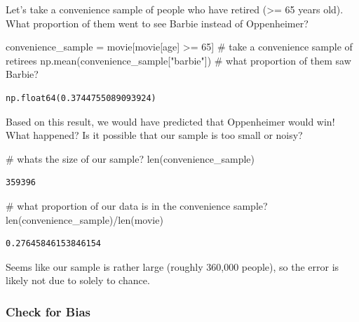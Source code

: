 \documentclass[
  letterpaper,
  DIV=11,
  numbers=noendperiod]{scrreprt}
\newenvironment{Shaded}{\begin{snugshade}}{\end{snugshade}}
\newcommand{\BuiltInTok}[1]{\textcolor[rgb]{0.00,0.23,0.31}{#1}}
\newcommand{\CommentTok}[1]{\textcolor[rgb]{0.37,0.37,0.37}{#1}}
\newcommand{\DecValTok}[1]{\textcolor[rgb]{0.68,0.00,0.00}{#1}}
\newcommand{\NormalTok}[1]{\textcolor[rgb]{0.00,0.23,0.31}{#1}}
\newcommand{\OperatorTok}[1]{\textcolor[rgb]{0.37,0.37,0.37}{#1}}
\newcommand{\StringTok}[1]{\textcolor[rgb]{0.13,0.47,0.30}{#1}}
\begin{document}
Let's take a convenience sample of people who have retired
(\textgreater= 65 years old). What proportion of them went to see Barbie
instead of Oppenheimer?

\begin{Shaded}
\begin{Highlighting}[]
\NormalTok{convenience\_sample }\OperatorTok{=}\NormalTok{ movie[movie[}\StringTok{\textquotesingle{}age\textquotesingle{}}\NormalTok{] }\OperatorTok{\textgreater{}=} \DecValTok{65}\NormalTok{] }\CommentTok{\# take a convenience sample of retirees}
\NormalTok{np.mean(convenience\_sample[}\StringTok{"barbie"}\NormalTok{]) }\CommentTok{\# what proportion of them saw Barbie? }
\end{Highlighting}
\end{Shaded}

\begin{verbatim}
np.float64(0.3744755089093924)
\end{verbatim}

Based on this result, we would have predicted that Oppenheimer would
win! What happened? Is it possible that our sample is too small or
noisy?

\begin{Shaded}
\begin{Highlighting}[]
\CommentTok{\# what\textquotesingle{}s the size of our sample? }
\BuiltInTok{len}\NormalTok{(convenience\_sample)}
\end{Highlighting}
\end{Shaded}

\begin{verbatim}
359396
\end{verbatim}

\begin{Shaded}
\begin{Highlighting}[]
\CommentTok{\# what proportion of our data is in the convenience sample? }
\BuiltInTok{len}\NormalTok{(convenience\_sample)}\OperatorTok{/}\BuiltInTok{len}\NormalTok{(movie)}
\end{Highlighting}
\end{Shaded}

\begin{verbatim}
0.27645846153846154
\end{verbatim}

Seems like our sample is rather large (roughly 360,000 people), so the
error is likely not due to solely to chance.

\subsubsection{Check for Bias}\label{check-for-bias}
\end{document}
